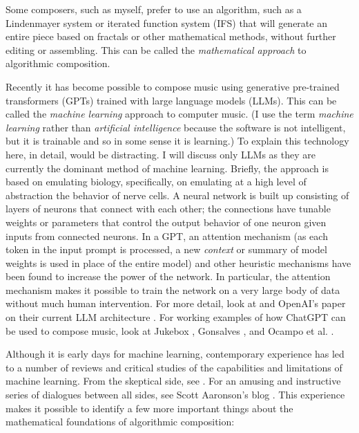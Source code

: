 \documentclass[11pt]{amsart}
\begin{document}
Some composers, such as myself, prefer to use an algorithm, such as a Lindenmayer system \cite{algorithmicbeautyofplants, prusinkiewicz1986sgs,  fractalmusicwithstringrewritinggrammars} or iterated function system (IFS) \cite{fractalseverywhere, ifsmusic} that will generate an entire piece based on fractals or other mathematical methods, without further editing or assembling. This can be called the \emph{mathematical approach} to algorithmic composition.

Recently it has become possible to compose music using generative pre-trained transformers (GPTs) trained with large language models (LLMs). This can be called the \emph{machine learning} approach to computer music. (I use the term \emph{machine learning} rather than \emph{artificial intelligence} because the software is not intelligent, but it is trainable and so in some sense it is learning.) To explain this technology here, in detail, would be distracting. I will discuss only LLMs as they are currently the dominant method of machine learning. Briefly, the approach is based on emulating biology, specifically, on emulating at a high level of abstraction the behavior of nerve cells. A neural network is built up consisting of layers of neurons that connect with each other; the connections have tunable weights or parameters that control the output behavior of one neuron given inputs from connected neurons. In a GPT, an attention mechanism (as each token in the input prompt is processed, a new \emph{context} or summary of model weights is used in place of the entire model) and other heuristic mechanisms have been found to increase the power of the network. In particular, the attention mechanism makes it possible to train the network on a very large body of data without much human intervention. For more detail, look at \cite{zhang2023complete} and OpenAI's paper on their current LLM architecture \cite{openai2023gpt4}. For working examples of how ChatGPT can be used to compose music, look at Jukebox \cite{openai2023jukebox}, Gonsalves \cite{aitunes}, and Ocampo et al. \cite{ocampo2023using}.

Although it is early days for machine learning, contemporary experience has led to a number of reviews and critical studies of the capabilities and limitations of machine learning. From the skeptical side, see \cite{dale2021gpt}. For an amusing and instructive series of dialogues between all sides, see Scott Aaronson's blog \cite{shtetl}. This experience makes it possible to identify a few more important things about the mathematical foundations of algorithmic composition:
\end{document}
